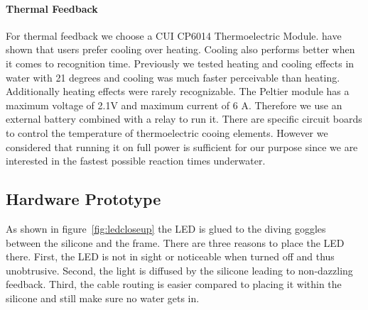 \paragraph{Thermal Feedback}

For thermal feedback we choose a CUI CP6014 Thermoelectric Module. 
\cite{Peiris_thermoVR} have shown that users prefer cooling over heating.
Cooling also performs better when it comes to recognition time.
Previously we tested heating and cooling effects in water with 21 degrees and cooling was much faster perceivable than heating.
Additionally heating effects were rarely recognizable.
The Peltier module has a maximum voltage of 2.1V and maximum current of 6 A.
Therefore we use an external battery combined with a relay to run it.
There are specific circuit boards to control the temperature of thermoelectric cooing elements.
However we considered that running it on full power is sufficient for our purpose since we are interested in the fastest possible reaction times underwater.


\subsection{Hardware Prototype}

As shown in figure~\ref{fig:ledcloseup} the LED is glued to the diving goggles between the silicone and the frame.
There are three reasons to place the LED there.
First, the LED is not in sight or noticeable when turned off and thus unobtrusive.
Second, the light is diffused by the silicone leading to non-dazzling feedback.
Third, the cable routing is easier compared to placing it within the silicone and still make sure no water gets in.

